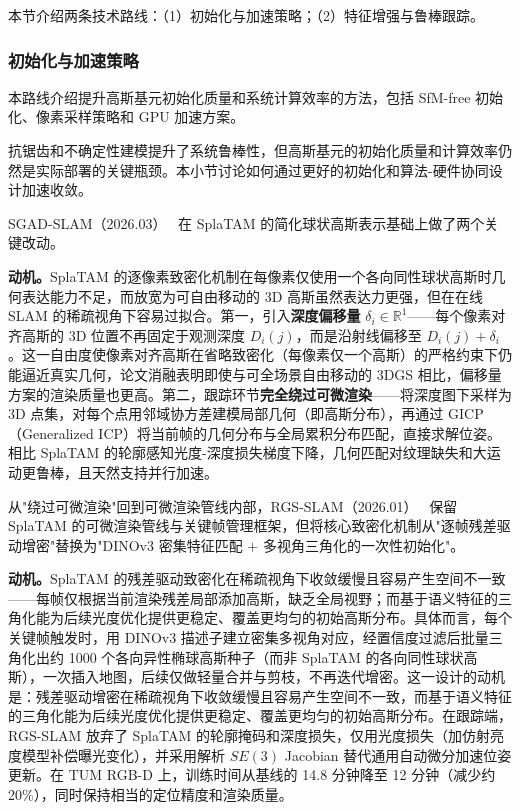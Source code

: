 本节介绍两条技术路线：（1）初始化与加速策略；（2）特征增强与鲁棒跟踪。

\subsubsection{初始化与加速策略}

本路线介绍提升高斯基元初始化质量和系统计算效率的方法，包括 SfM-free 初始化、像素采样策略和 GPU 加速方案。

抗锯齿和不确定性建模提升了系统鲁棒性，但高斯基元的初始化质量和计算效率仍然是实际部署的关键瓶颈。本小节讨论如何通过更好的初始化和算法-硬件协同设计加速收敛。

SGAD-SLAM（2026.03）~\cite{2603_21055} 在 SplaTAM 的简化球状高斯表示基础上做了两个关键改动。

\textbf{动机。}SplaTAM 的逐像素致密化机制在每像素仅使用一个各向同性球状高斯时几何表达能力不足，而放宽为可自由移动的 3D 高斯虽然表达力更强，但在在线 SLAM 的稀疏视角下容易过拟合。第一，引入\textbf{深度偏移量} $\delta_i \in \mathbb{R}^1$——每个像素对齐高斯的 3D 位置不再固定于观测深度 $D_i(j)$，而是沿射线偏移至 $D_i(j) + \delta_i$。这一自由度使像素对齐高斯在省略致密化（每像素仅一个高斯）的严格约束下仍能逼近真实几何，论文消融表明即使与可全场景自由移动的 3DGS 相比，偏移量方案的渲染质量也更高。第二，跟踪环节\textbf{完全绕过可微渲染}——将深度图下采样为 3D 点集，对每个点用邻域协方差建模局部几何（即高斯分布），再通过 GICP（Generalized ICP）将当前帧的几何分布与全局累积分布匹配，直接求解位姿。相比 SplaTAM 的轮廓感知光度-深度损失梯度下降，几何匹配对纹理缺失和大运动更鲁棒，且天然支持并行加速。

从"绕过可微渲染"回到可微渲染管线内部，RGS-SLAM（2026.01）~\cite{2601_00705} 保留 SplaTAM 的可微渲染管线与关键帧管理框架，但将核心致密化机制从"逐帧残差驱动增密"替换为"DINOv3 密集特征匹配 $+$ 多视角三角化的一次性初始化"。

\textbf{动机。}SplaTAM 的残差驱动致密化在稀疏视角下收敛缓慢且容易产生空间不一致——每帧仅根据当前渲染残差局部添加高斯，缺乏全局视野；而基于语义特征的三角化能为后续光度优化提供更稳定、覆盖更均匀的初始高斯分布。具体而言，每个关键帧触发时，用 DINOv3 描述子建立密集多视角对应，经置信度过滤后批量三角化出约 1000 个各向异性椭球高斯种子（而非 SplaTAM 的各向同性球状高斯），一次插入地图，后续仅做轻量合并与剪枝，不再迭代增密。这一设计的动机是：残差驱动增密在稀疏视角下收敛缓慢且容易产生空间不一致，而基于语义特征的三角化能为后续光度优化提供更稳定、覆盖更均匀的初始高斯分布。在跟踪端，RGS-SLAM 放弃了 SplaTAM 的轮廓掩码和深度损失，仅用光度损失（加仿射亮度模型补偿曝光变化），并采用解析 $SE(3)$ Jacobian 替代通用自动微分加速位姿更新。在 TUM RGB-D 上，训练时间从基线的 14.8 分钟降至 12 分钟（减少约 20\%），同时保持相当的定位精度和渲染质量。

